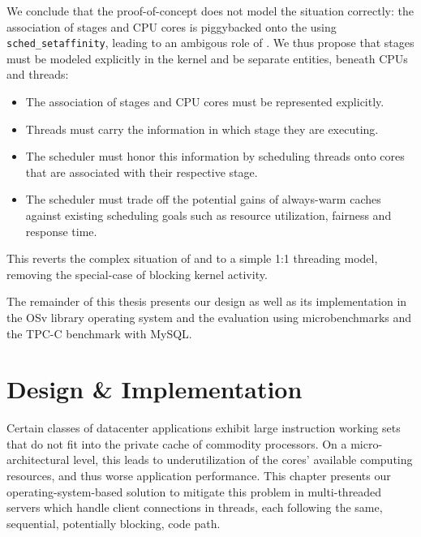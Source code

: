 \documentclass[12pt,a4paper]{book}
\begin{document}
We conclude that the proof-of-concept does not model the situation correctly: the association of stages and CPU cores is piggybacked onto the \klts using \texttt{sched\_setaffinity}, leading to an ambigous role of \klts.
We thus propose that stages must be modeled explicitly in the kernel and be separate entities, beneath CPUs and threads:
\begin{itemize}%
    \item The association of stages and CPU cores must be represented explicitly.
    \item Threads must carry the information in which stage they are executing.
    \item The scheduler must honor this information by scheduling threads onto cores that are associated with their respective stage.
    \item The scheduler must trade off the potential gains of always-warm caches against existing scheduling goals such as resource utilization, fairness and response time.
\end{itemize}%
This reverts the complex situation of \ults and \klts to a simple 1:1 threading model, removing the special-case of blocking kernel activity.

The remainder of this thesis presents our design as well as its implementation in the OSv library operating system and the evaluation using microbenchmarks and the TPC-C benchmark with MySQL.

\chapter{Design \& Implementation}\label{ch:di}
Certain classes of datacenter applications exhibit large instruction working sets that do not fit into the private cache of commodity processors.
On a micro-architectural level, this leads to underutilization of the cores' available computing resources, and thus worse application performance.
This chapter presents our operating-system-based solution to mitigate this problem in multi-threaded servers which handle client connections in threads, each following the same, sequential, potentially blocking, code path.
\end{document}
